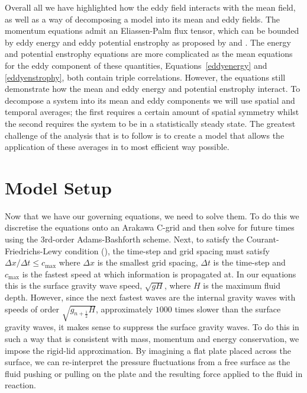 \documentclass[12pt,a4paper]{report}
\newcommand*{\half}{\frac{1}{2}}
\begin{document}
            Overall all we have highlighted how the eddy field interacts with the mean
            field, as well as a way of decomposing a model into its mean and eddy fields.
            The momentum equations admit an Eliassen-Palm flux tensor, which can
            be bounded by eddy energy and eddy potential enstrophy as proposed
            by \cite{marshall2012framework} and \cite{maddison2013eliassen}. 
            The energy and potential enstrophy equations are more complicated
            as the mean equations for the eddy component of these quantities,
            Equations~\eqref{eddyenergy} and \eqref{eddyenstrophy}, both contain
            triple correlations. However, the equations still demonstrate how
            the mean and eddy energy and potential enstrophy interact.
            To decompose a system into its mean and eddy components we will
            use spatial and temporal averages; the first requires a certain
            amount of spatial symmetry whilst the second requires the system to be
            in a statistically steady state. The greatest challenge of the analysis
            that is to follow is to create a model that allows the application of 
            these averages in to most efficient way possible.
            
                            
    

\section{Model Setup}

Now that we have our governing equations, we need to solve them. To do this we
discretise the equations onto an Arakawa C-grid and then solve for future times
using the 3rd-order Adams-Bashforth scheme. Next, to satisfy the Courant-Friedrichs-Lewy
 condition (\cite{courant1928partiellen}), the time-step and grid spacing must satisfy ${\Delta x}/{\Delta t} \leq c_{\max}$ where $\Delta x$ is the smallest grid spacing, $\Delta t$ is
 the time-step and $c_{\max}$ is the fastest speed at which information is propagated at. 
 In our equations this is the surface gravity wave speed, $\sqrt{g H}$, where $H$ is the
 maximum fluid depth. However, since the next fastest waves are the internal gravity
  waves with speeds of order $\sqrt{g_{n+\half} H}$, approximately $1000$ times slower than the surface gravity waves, it makes sense to suppress the surface gravity
  waves. To do this in such a way that is consistent with mass, momentum and energy 
  conservation, we impose the rigid-lid approximation. By imagining a flat plate 
  placed across the surface, we can re-interpret the pressure fluctuations from a free
  surface as the fluid pushing or pulling on the plate and the resulting force 
  applied to the fluid in reaction. 
  
\end{document}
